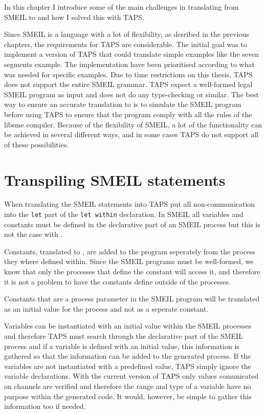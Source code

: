 In this chapter I introduce some of the main challenges in translating from SMEIL to \cspm{} and how I solved this with TAPS.

Since SMEIL is a language with a lot of flexibility, as desribed in the previous chapters, the requirements for TAPS are considerable. The initial goal was to implement a version of TAPS that could translate simple examples like the seven segments example. The implementation have been prioritised according to what was needed for specific examples. Due to time restrictions on this thesis, TAPS does not support the entire SMEIL grammar. TAPS expect a well-formed legal SMEIL program as input and does not do any type-checking or similar. The best way to ensure an accurate translation to \cspm{} is to simulate the SMEIL program before using TAPS to ensure that the program comply with all the rules of the libsme compiler.
Because of the flexibility of SMEIL, a lot of the functionality can be achieved in several different ways, and in some cases TAPS do not support all of these possibilities.
\section{Transpiling SMEIL statements}
When translating the SMEIL statements into \cspm{} TAPS put all non-communication into the \texttt{let} part of the \texttt{let within} declaration. In SMEIL all variables and constants must be defined in the declarative part of an SMEIL process but this is not the case with \cspm{}.

Constants, translated to \cspm{}, are added to the \cspm{} program seperately from the process they where defined within. Since the SMEIL programs must be well-formed, we know that only the processes that define the constant will access it, and therefore it is not a problem to have the constants define outside of the processes.

Constants that are a process parameter in the SMEIL program will be translated as an initial value for the process and not as a seperate \cspm{} constant.

Variables can be instantiated with an initial value within the SMEIL processes and therefore TAPS must search through the declarative part of the SMEIL process and if a variable is defined with an initial value, this information is gathered so that the information can be added to the generated \cspm{} process. If the variables are not instantiated with a predefined value, TAPS simply ignore the variable declarations. With the current version of TAPS only values comunicated on channels are verified and therefore the range and type of a variable have no purpose within the generated \cspm{} code. It would, however, be simple to gather this information too if needed.\\

